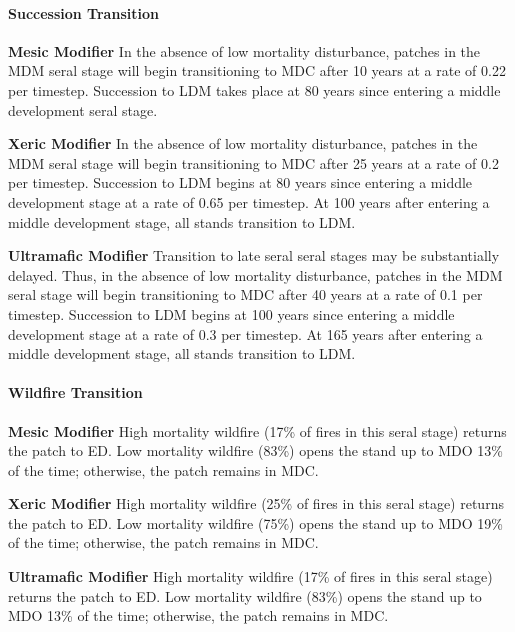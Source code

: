 \paragraph{Succession Transition}
\begin{adjustwidth}{2cm}{}
\noindent \textbf{Mesic Modifier } In the absence of low mortality disturbance, patches in the MDM seral stage will begin transitioning to MDC after 10 years at a rate of 0.22 per timestep. Succession to LDM takes place at 80 years since entering a middle development seral stage. 

\medskip
\noindent \textbf{Xeric Modifier}  In the absence of low mortality disturbance, patches in the MDM seral stage will begin transitioning to MDC after 25 years at a rate of 0.2 per timestep. Succession to LDM begins at 80 years since entering a middle development stage at a rate of 0.65 per timestep. At 100 years after entering a middle development stage, all stands transition to LDM. 

\medskip
\noindent \textbf{Ultramafic Modifier} Transition to late seral seral stages may be substantially delayed. Thus, in the absence of low mortality disturbance, patches in the MDM seral stage will begin transitioning to MDC after 40 years at a rate of 0.1 per timestep. Succession to LDM begins at 100 years since entering a middle development stage at a rate of 0.3 per timestep. At 165 years after entering a middle development stage, all stands transition to LDM. 

\end{adjustwidth}

\paragraph{Wildfire Transition}
\begin{adjustwidth}{2cm}{}
\noindent \textbf{Mesic Modifier } High mortality wildfire (17\% of fires in this seral stage) returns the patch to ED. Low mortality wildfire (83\%) opens the stand up to MDO 13\% of the time; otherwise, the patch remains in MDC. 

\medskip
\noindent \textbf{Xeric Modifier}  High mortality wildfire (25\% of fires in this seral stage) returns the patch to ED. Low mortality wildfire (75\%) opens the stand up to MDO 19\% of the time; otherwise, the patch remains in MDC.

\medskip
\noindent \textbf{Ultramafic Modifier} High mortality wildfire (17\% of fires in this seral stage) returns the patch to ED. Low mortality wildfire (83\%) opens the stand up to MDO 13\% of the time; otherwise, the patch remains in MDC.

\end{adjustwidth}

